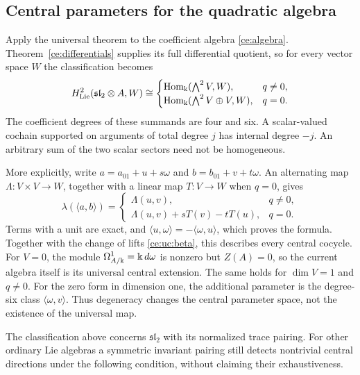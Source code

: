 \subsection{Central parameters for the quadratic algebra}

Apply the universal theorem to the coefficient algebra
\eqref{ce:algebra}.  Theorem~\ref{ce:differentials} supplies its full
differential quotient, so for every vector space $W$ the classification
becomes
\begin{equation}\label{ce:all-central-parameters}
 H^2_{\mathrm{Lie}}(\mathfrak{sl}_2\otimes A,W)
 \cong\begin{cases}
 \operatorname{Hom}_\Bbbk(\bigwedge^2V,W),&q\ne0,\\
 \operatorname{Hom}_\Bbbk(\bigwedge^2V\oplus V,W),&q=0.
 \end{cases}
\end{equation}
The coefficient degrees of these summands are four and six.
A scalar-valued cochain supported on arguments of total degree $j$
has internal degree $-j$.  An arbitrary sum of the two scalar sectors
need not be homogeneous.

More explicitly, write $a=a_01+u+s\omega$ and $b=b_01+v+t\omega$.
An alternating map $\Lambda:V\times V\to W$, together with a linear
map $T:V\to W$ when $q=0$, gives
\begin{equation}\label{ce:uc:all-parameters}
 \lambda(\langle a,b\rangle)=
 \begin{cases}
 \Lambda(u,v),&q\ne0,\\
 \Lambda(u,v)+sT(v)-tT(u),&q=0.
 \end{cases}
\end{equation}
Terms with a unit are exact, and
$\langle u,\omega\rangle=-\langle\omega,u\rangle$, which proves
the formula.  Together with the change of lifts
\eqref{ce:uc:beta}, this describes every central cocycle.
For $V=0$, the module $\Omega^1_{A/\Bbbk}=\Bbbk\,d\omega$ is nonzero but
$Z(A)=0$, so the current algebra itself is its universal central
extension.  The same holds for $\dim V=1$ and $q\ne0$.
For the zero form in dimension one, the additional parameter is the
degree-six class $\langle\omega,v\rangle$.  Thus degeneracy changes
the central parameter space, not the existence of the universal map.

The classification above concerns $\mathfrak{sl}_2$ with its normalized
trace pairing.  For other ordinary Lie algebras a symmetric invariant
pairing still detects nontrivial central directions under the following
condition, without claiming their exhaustiveness.

